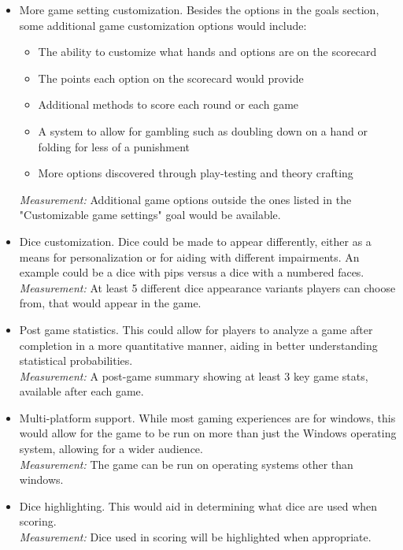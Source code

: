 \documentclass{article}
\begin{document}
\begin{itemize}
	\item More game setting customization. Besides the options in the goals section, some additional game customization options would include:
	\begin{itemize}
        \item The ability to customize what hands and options are on the scorecard
        \item The points each option on the scorecard would provide
        \item Additional methods to score each round or each game
        \item A system to allow for gambling such as doubling down on a hand or folding for less of a punishment
        \item More options discovered through play-testing and theory crafting
    \end{itemize}
	\textit{Measurement:} Additional game options outside the ones listed in the "Customizable game settings" goal would be available.
	
	\item Dice customization. Dice could be made to appear differently, either as a means for personalization or for aiding with different impairments. An example could be a dice with pips versus a dice with a numbered faces.\\
	\textit{Measurement:} At least 5 different dice appearance variants players can choose from, that would appear in the game.
	
	\item Post game statistics. This could allow for players to analyze a game after completion in a more quantitative manner, aiding in better understanding statistical probabilities.\\
	\textit{Measurement:} A post-game summary showing at least 3 key game stats, available after each game.
	
	\item Multi-platform support. While most gaming experiences are for windows, this would allow for the game to be run on more than just the Windows operating system, allowing for a wider audience.\\
	\textit{Measurement:} The game can be run on operating systems other than windows.
	
	\item Dice highlighting. This would aid in determining what dice are used when scoring.\\
	\textit{Measurement:} Dice used in scoring will be highlighted when appropriate.
	
\end{itemize}
\end{document}
